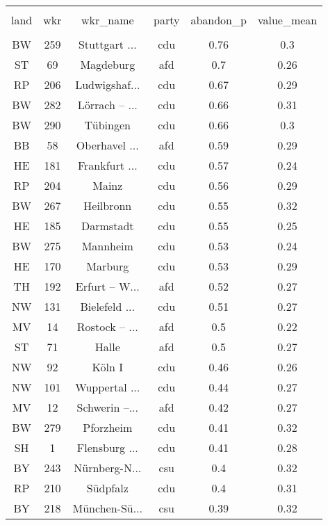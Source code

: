 
\begin{table}[!htbp] \centering 
  \caption{} 
  \label{} 
\begin{tabular}{@{\extracolsep{5pt}} cccccc} 
\\[-1.8ex]\hline 
\hline \\[-1.8ex] 
land & wkr & wkr\_name & party & abandon\_p & value\_mean \\ 
\hline \\[-1.8ex] 
BW & 259 & Stuttgart ... & cdu & 0.76 & 0.3 \\ 
ST & 69 & Magdeburg & afd & 0.7 & 0.26 \\ 
RP & 206 & Ludwigshaf... & cdu & 0.67 & 0.29 \\ 
BW & 282 & Lörrach – ... & cdu & 0.66 & 0.31 \\ 
BW & 290 & Tübingen & cdu & 0.66 & 0.3 \\ 
BB & 58 & Oberhavel ... & afd & 0.59 & 0.29 \\ 
HE & 181 & Frankfurt ... & cdu & 0.57 & 0.24 \\ 
RP & 204 & Mainz & cdu & 0.56 & 0.29 \\ 
BW & 267 & Heilbronn & cdu & 0.55 & 0.32 \\ 
HE & 185 & Darmstadt & cdu & 0.55 & 0.25 \\ 
BW & 275 & Mannheim & cdu & 0.53 & 0.24 \\ 
HE & 170 & Marburg & cdu & 0.53 & 0.29 \\ 
TH & 192 & Erfurt – W... & afd & 0.52 & 0.27 \\ 
NW & 131 & Bielefeld ... & cdu & 0.51 & 0.27 \\ 
MV & 14 & Rostock – ... & afd & 0.5 & 0.22 \\ 
ST & 71 & Halle & afd & 0.5 & 0.27 \\ 
NW & 92 & Köln I & cdu & 0.46 & 0.26 \\ 
NW & 101 & Wuppertal ... & cdu & 0.44 & 0.27 \\ 
MV & 12 & Schwerin –... & afd & 0.42 & 0.27 \\ 
BW & 279 & Pforzheim & cdu & 0.41 & 0.32 \\ 
SH & 1 & Flensburg ... & cdu & 0.41 & 0.28 \\ 
BY & 243 & Nürnberg-N... & csu & 0.4 & 0.32 \\ 
RP & 210 & Südpfalz & cdu & 0.4 & 0.31 \\ 
BY & 218 & München-Sü... & csu & 0.39 & 0.32 \\ 

\end{tabular}
\end{table}

